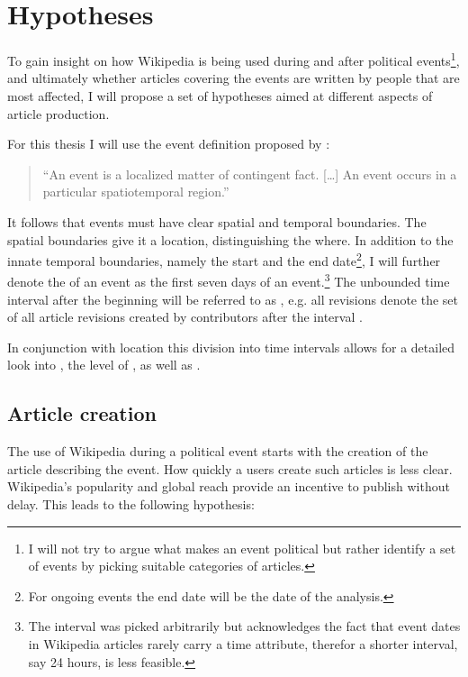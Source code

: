 \chapter{Hypotheses}\label{ch:hypotheses}

To gain insight on how Wikipedia is being used during and after political events\footnote{I will not try to argue what makes an event political but rather identify a set of events by picking suitable categories of articles.}, and ultimately whether articles covering the events are written by people that are most affected, I will propose a set of hypotheses aimed at different aspects of article production.

For this thesis I will use the event definition proposed by \textcite[243]{lewis1987philosophical}: 
\begin{quotation}
``An event is a localized matter of contingent fact. [\ldots] An event occurs in a particular spatiotemporal region.''
\end{quotation}
It follows that events must have clear spatial and temporal boundaries.
The spatial boundaries give it a location, distinguishing the where.
In addition to the innate temporal boundaries, namely the start and the end date\footnote{For ongoing events the end date will be the date of the analysis.}, I will further denote the  of an event as the first seven days of an event.\footnote{The interval was picked arbitrarily but acknowledges the fact that event dates in Wikipedia articles rarely carry a time attribute, therefor a shorter interval, say 24 hours, is less feasible.}
The unbounded time interval after the beginning will be referred to as , e.g. all  revisions denote the set of all article revisions created by contributors after the interval .

In conjunction with location this division into time intervals allows for a detailed look into , the level of , as well as .

\section{Article creation}\label{sec:articlecreation}

The use of Wikipedia during a political event starts with the creation of the article describing the event.
How quickly a users create such articles is less clear.
Wikipedia's popularity and global reach provide an incentive to publish without delay.
This leads to the following hypothesis:

